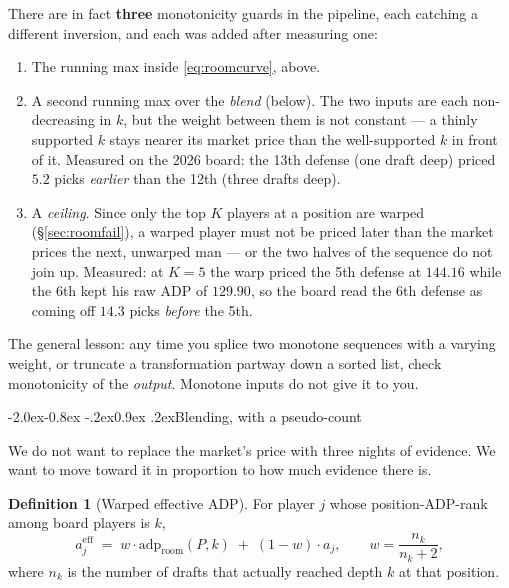 \documentclass[10pt,a4paper]{article}
\makeatletter
\theoremstyle{plain}
\theoremstyle{definition}
\newtheorem{definition}[theorem]{Definition}
\theoremstyle{remark}
\newcommand{\adp}{\mathrm{adp}}
\renewcommand\subsection{\@startsection{subsection}{2}{\z@}%
  {-2.0ex\@plus -0.8ex \@minus -.2ex}{0.9ex \@plus .2ex}{\normalfont\large\bfseries}}
\makeatother
\begin{document}
There are in fact \textbf{three} monotonicity guards in the pipeline, each catching a
different inversion, and each was added after measuring one:

\begin{enumerate}
\item The running max inside \eqref{eq:roomcurve}, above.
\item A second running max over the \emph{blend} (below). The two inputs are each
non-decreasing in $k$, but the weight between them is not constant --- a thinly supported
$k$ stays nearer its market price than the well-supported $k$ in front of it. Measured on
the 2026 board: the 13th defense (one draft deep) priced $5.2$ picks \emph{earlier} than
the 12th (three drafts deep).
\item A \emph{ceiling}. Since only the top $K$ players at a position are warped
(\S\ref{sec:roomfail}), a warped player must not be priced later than the market prices
the next, unwarped man --- or the two halves of the sequence do not join up. Measured:
at $K = 5$ the warp priced the 5th defense at $144.16$ while the 6th kept his raw ADP of
$129.90$, so the board read the 6th defense as coming off $14.3$ picks \emph{before} the
5th.
\end{enumerate}

The general lesson: any time you splice two monotone sequences with a varying weight, or
truncate a transformation partway down a sorted list, check monotonicity of the
\emph{output}. Monotone inputs do not give it to you.

\subsection{Blending, with a pseudo-count}

We do not want to replace the market's price with three nights of evidence. We want to
move toward it in proportion to how much evidence there is.

\begin{definition}[Warped effective ADP]
For player $j$ whose position-ADP-rank among board players is $k$,
\begin{equation}
a^{\text{eff}}_j \;=\; w\cdot\adp_{\text{room}}(P,k) \;+\; (1-w)\cdot a_j,
\qquad
w = \frac{n_k}{n_k + 2},
\label{eq:warp}
\end{equation}
where $n_k$ is the number of drafts that actually reached depth $k$ at that position.
\end{definition}
\end{document}
